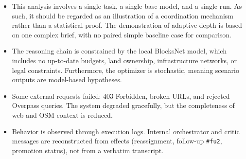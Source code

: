 \begin{itemize}
  \item This analysis involves a single task, a single base model, and a single run. As such, it should be regarded as an illustration of a coordination mechanism rather than a statistical proof. The demonstration of adaptive depth is based on one complex brief, with no paired simple baseline case for comparison.
  \item The reasoning chain is constrained by the local BlocksNet model, which includes no up-to-date budgets, land ownership, infrastructure networks, or legal constraints. Furthermore, the optimizer is stochastic, meaning scenario outputs are model-based hypotheses.
  \item Some external requests failed: 403 Forbidden, broken URLs, and rejected Overpass queries. The system degraded gracefully, but the completeness of web and OSM context is reduced.
  \item Behavior is observed through execution logs. Internal orchestrator and critic messages are reconstructed from effects (reassignment, follow-up \texttt{\#fu2}, promotion status), not from a verbatim transcript.
\end{itemize}
